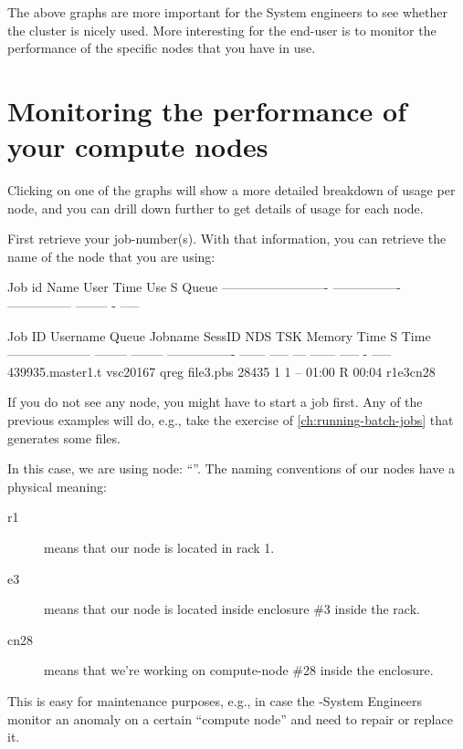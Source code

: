 The above graphs are more important for the \hpc System engineers to see
whether the cluster is nicely used. More interesting for the end-user is to
monitor the performance of the specific nodes that you have in use.

\section{Monitoring the performance of your compute nodes}

Clicking on one of the graphs will show a more detailed breakdown of usage per
node, and you can drill down further to get details of usage for each node.

First retrieve your job-number(s). With that information, you can retrieve the
name of the node that you are using:

\begin{prompt}
Job id                    Name             User            Time Use S Queue
------------------------- ---------------- --------------- -------- - -----

Job ID               Username Queue    Jobname          SessID NDS   TSK Memory Time  S Time
-------------------- -------- -------- ---------------- ------ ----- --- ------ ----- - -----
439935.master1.t     vsc20167 qreg     file3.pbs         28435     1   1    --  01:00 R 00:04
   r1e3cn28
\end{prompt}

If you do not see any node, you might have to start a job first. Any of the
previous examples will do, e.g., take the exercise of \autoref{ch:running-batch-jobs} that generates
some files.


In this case, we are using node: ``''.
The naming conventions of our nodes have a physical meaning:

\begin{description}
  \item[r1] means that our node is located in rack 1.
  \item[e3] means that our node is located inside enclosure \#3 inside the rack.
  \item[cn28] means that we're working on compute-node \#28 inside the enclosure.
\end{description}

This is easy for maintenance purposes, e.g., in case the \hpc-System
Engineers monitor an anomaly on a certain ``compute node'' and need to repair
or replace it.

